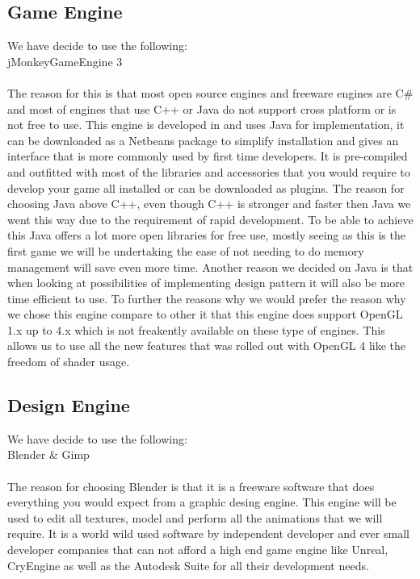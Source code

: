 \documentclass[letterpaper]{article}
\begin{document}
			
			\subsection*{Game Engine}
			
			\vspace{0.1cm}
			
			We have decide to use the following: \\
			\indent jMonkeyGameEngine 3 \\
			\\
			The reason for this is that most open source engines and freeware engines are C\# and most of engines that use C++ or Java do not support cross platform or is not free to use. This engine is developed in and uses Java for implementation, it can be downloaded as a Netbeans package to simplify installation and gives an interface that is more commonly used by first time developers. It is pre-compiled and outfitted with most of the libraries and accessories that you would require to develop your game all installed or can be downloaded as plugins. The reason for choosing Java above C++, even though C++ is stronger and faster then Java we went this way due to the requirement of rapid development. To be able to achieve this Java offers a lot more open libraries for free use, mostly seeing as this is the first game we will be undertaking the ease of not needing to do memory management will save even more time. Another reason we decided on Java is that when looking at possibilities of implementing design pattern it will also be more time efficient to use. To further the reasons why we would prefer the reason why we chose this engine compare to other it that this engine does support OpenGL 1.x up to 4.x which is not freakently available on these type of engines. This allows us to use all the new features that was rolled out with OpenGL 4 like the freedom of shader usage.
			
			\vspace{0.1cm}
			
			\subsection*{Design Engine}
			
			\vspace{0.1cm}
			
			We have decide to use the following: \\
			\indent Blender \& Gimp \\
			\\
			The reason for choosing Blender is that it is a freeware software that does everything you would expect from a graphic desing engine. This engine will be used to edit all textures, model and perform all the animations that we will require. It is a world wild used software by independent developer and ever small developer companies that can not afford a high end game engine like Unreal, CryEngine as well as the Autodesk Suite for all their development needs.
			
\end{document}

